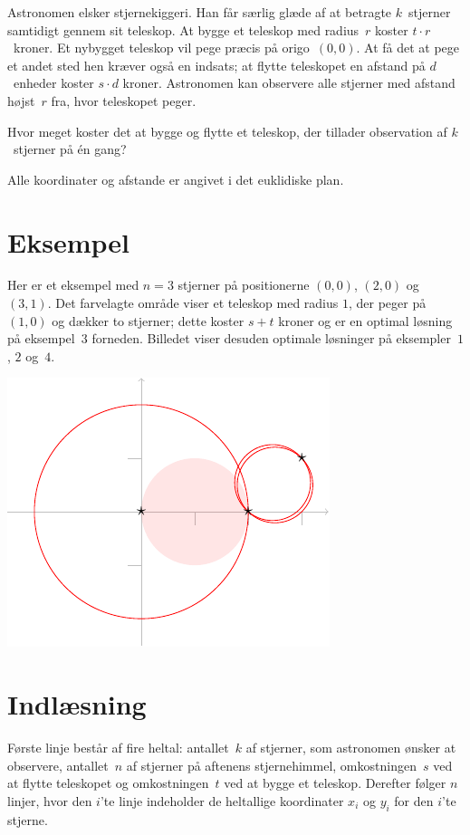 
\noindent
Astronomen elsker stjernekiggeri.
Han får særlig glæde af at betragte $k$~stjerner samtidigt gennem sit teleskop.
At bygge et teleskop med radius~$r$ koster $t \cdot r$~kroner.
Et nybygget teleskop vil pege præcis på origo~$(0,0)$.
At få det at pege et andet sted hen kræver også en indsats;
at flytte teleskopet en afstand på $d$~enheder koster $s \cdot d$ kroner.
Astronomen kan observere alle stjerner med afstand højst~$r$ fra, hvor teleskopet peger.

Hvor meget koster det at bygge og flytte et teleskop, der tillader observation af $k$~stjerner på én gang?

\medskip

Alle koordinater og afstande er angivet i det euklidiske plan.

\section*{Eksempel}

Her er et eksempel med $n=3$ stjerner på positionerne $(0,0)$, $(2,0)$ og $(3,1)$.
Det farvelagte område viser et teleskop med radius $1$, der peger på $(1,0)$ og dækker to stjerner; dette koster $s + t$ kroner og er en optimal løsning på eksempel~$3$ forneden.
Billedet viser desuden optimale løsninger på eksempler~$1$, $2$ og~$4$.

\medskip
\noindent
\includegraphics[width=.3\textwidth]{img/samples.pdf}

\section*{Indlæsning}

Første linje består af fire heltal:
antallet~$k$ af stjerner, som astronomen ønsker at observere,
antallet~$n$ af stjerner på aftenens stjernehimmel,
omkostningen~$s$ ved at flytte teleskopet og
omkostningen~$t$ ved at bygge et teleskop.
Derefter følger $n$ linjer, hvor den $i$'te linje indeholder de heltallige koordinater $x_i$ og $y_i$ for den $i$'te stjerne.


